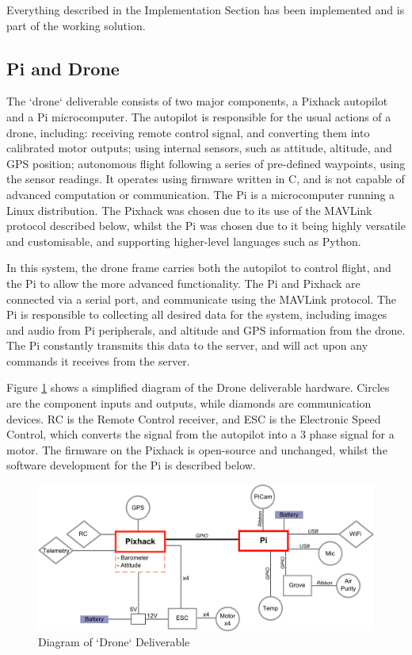 \documentclass{article}
\begin{document}
 
Everything described in the Implementation Section has been implemented and is part of the working solution. 
 
\subsection{Pi and Drone}
The `drone` deliverable consists of two major components, a Pixhack autopilot and a Pi microcomputer. The autopilot is responsible for the usual actions of a drone, including: receiving remote control signal, and converting them into calibrated motor outputs; using internal sensors, such as attitude, altitude, and GPS position; autonomous flight following a series of pre-defined waypoints, using the sensor readings. It operates using firmware written in C, and is not capable of advanced computation or communication. The Pi is a microcomputer running a Linux distribution. The Pixhack was chosen due to its use of the MAVLink protocol described below, whilst the Pi was chosen due to it being highly versatile and customisable, and supporting higher-level languages such as Python. 

In this system, the drone frame carries both the autopilot to control flight, and the Pi to allow the more advanced functionality. The Pi and Pixhack are connected via a serial port, and communicate using the MAVLink protocol. The Pi is responsible to collecting all desired data for the system, including images and audio from Pi peripherals, and altitude and GPS information from the drone. The Pi constantly transmits this data to the server, and will act upon any commands it receives from the server.

Figure \ref{fig:DroneDiagram} shows a simplified diagram of the Drone deliverable hardware. Circles are the component inputs and outputs, while diamonds are communication devices. RC is the Remote Control receiver, and ESC is the Electronic Speed Control, which converts the signal from the autopilot into a 3 phase signal for a motor. The firmware on the Pixhack is open-source and unchanged, whilst the software development for the Pi is described below.

\begin{figure}[h]
\centering
\caption{Diagram of `Drone` Deliverable\label{fig:DroneDiagram}}
\includegraphics[width=\textwidth]{DroneDiagram}
\end{figure}
\end{document}
